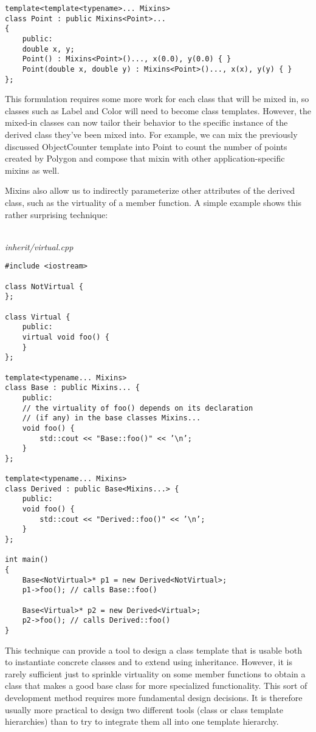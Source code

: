 \begin{lstlisting}[style=styleCXX]
template<template<typename>... Mixins>
class Point : public Mixins<Point>...
{
	public:
	double x, y;
	Point() : Mixins<Point>()..., x(0.0), y(0.0) { }
	Point(double x, double y) : Mixins<Point>()..., x(x), y(y) { }
};
\end{lstlisting}

This formulation requires some more work for each class that will be mixed in, so classes such as Label and Color will need to become class templates. However, the mixed-in classes can now tailor their behavior to the specific instance of the derived class they’ve been mixed into. For example, we can mix the previously discussed ObjectCounter template into Point to count the number of points created by Polygon and compose that mixin with other application-specific mixins as well.


Mixins also allow us to indirectly parameterize other attributes of the derived class, such as the virtuality of a member function. A simple example shows this rather surprising technique:

\hspace*{\fill} \\ %
\noindent
\textit{inherit/virtual.cpp}
\begin{lstlisting}[style=styleCXX]
#include <iostream>

class NotVirtual {
};

class Virtual {
	public:
	virtual void foo() {
	}
};

template<typename... Mixins>
class Base : public Mixins... {
	public:
	// the virtuality of foo() depends on its declaration
	// (if any) in the base classes Mixins...
	void foo() {
		std::cout << "Base::foo()" << ’\n’;
	}
};

template<typename... Mixins>
class Derived : public Base<Mixins...> {
	public:
	void foo() {
		std::cout << "Derived::foo()" << ’\n’;
	}
};

int main()
{
	Base<NotVirtual>* p1 = new Derived<NotVirtual>;
	p1->foo(); // calls Base::foo()
	
	Base<Virtual>* p2 = new Derived<Virtual>;
	p2->foo(); // calls Derived::foo()
}
\end{lstlisting}

This technique can provide a tool to design a class template that is usable both to instantiate concrete classes and to extend using inheritance. However, it is rarely sufficient just to sprinkle virtuality on some member functions to obtain a class that makes a good base class for more specialized functionality. This sort of development method requires more fundamental design decisions. It is therefore usually more practical to design two different tools (class or class template hierarchies) than to try to integrate them all into one template hierarchy.






